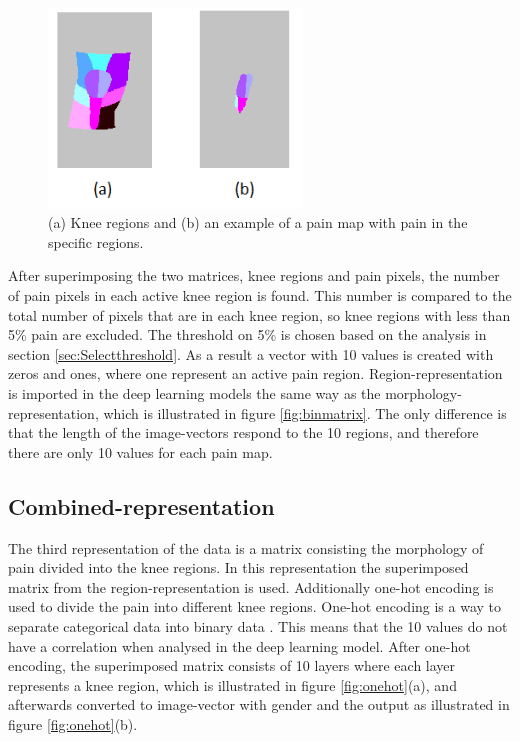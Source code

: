 \begin{figure} [H]
\centering
\includegraphics[width=0.6\textwidth]{figures/binregions}
\caption{(a) Knee regions and (b) an example of a pain map with pain in the specific regions.}
\label{fig:binregions}
\end{figure}

\noindent
After superimposing the two matrices, knee regions and pain pixels, the number of pain pixels in each active knee region is found. This number is compared to the total number of pixels that are in each knee region, so knee regions with less than 5\% pain are excluded. The threshold on 5\% is chosen based on the analysis in section \ref{sec:Selectthreshold}. As a result a vector with 10 values is created with zeros and ones, where one represent an active pain region. Region-representation is imported in the deep learning models the same way as the morphology-representation, which is illustrated in figure \ref{fig:binmatrix}. The only difference is that the length of the image-vectors respond to the 10 regions, and therefore there are only 10 values for each pain map.


\subsection{Combined-representation} \label{sec:combined}
The third representation of the data is a matrix consisting the morphology of pain divided into the knee regions.
\noindent
In this representation the superimposed matrix from the region-representation is used. Additionally one-hot encoding is used to divide the pain into different knee regions. One-hot encoding is a way to separate categorical data into binary data \citep{Harris2012}. This means that the 10 values do not have a correlation when analysed in the deep learning model. After one-hot encoding, the superimposed matrix consists of 10 layers where each layer represents a knee region, which is illustrated in figure \ref{fig:onehot}(a), and afterwards converted to image-vector with gender and the output as illustrated in figure \ref{fig:onehot}(b).

